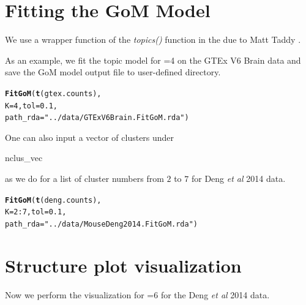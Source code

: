 \documentclass[12pt]{article}\usepackage[]{graphicx}\usepackage[usenames,dvipsnames]{color}
\makeatletter
\newcommand{\hlnum}[1]{\textcolor[rgb]{0.686,0.059,0.569}{#1}}%
\newcommand{\hlstr}[1]{\textcolor[rgb]{0.192,0.494,0.8}{#1}}%
\newcommand{\hlopt}[1]{\textcolor[rgb]{0,0,0}{#1}}%
\newcommand{\hlstd}[1]{\textcolor[rgb]{0.345,0.345,0.345}{#1}}%
\newcommand{\hlkwc}[1]{\textcolor[rgb]{0.333,0.667,0.333}{#1}}%
\newcommand{\hlkwd}[1]{\textcolor[rgb]{0.737,0.353,0.396}{\textbf{#1}}}%
\newenvironment{kframe}{%
 \def\at@end@of@kframe{}%
 \ifinner\ifhmode%
  \def\at@end@of@kframe{\end{minipage}}%
  \begin{minipage}{\columnwidth}%
 \fi\fi%
 \def\FrameCommand##1{\hskip\@totalleftmargin \hskip-\fboxsep
 \colorbox{shadecolor}{##1}\hskip-\fboxsep
     \hskip-\linewidth \hskip-\@totalleftmargin \hskip\columnwidth}%
 \MakeFramed {\advance\hsize-\width
   \@totalleftmargin\z@ \linewidth\hsize
   \@setminipage}}%
 {\par\unskip\endMakeFramed%
 \at@end@of@kframe}
\newenvironment{knitrout}{}{} %
\makeatother
\begin{document}
\section{Fitting the GoM Model}

We use a wrapper function of the \textit{topics()} function in the  due to Matt Taddy \cite{Taddy2012}.

As an example, we fit the topic model for =4 on the GTEx V6 Brain data and save the GoM model output file to user-defined directory.

\begin{knitrout}
\color{fgcolor}\begin{kframe}
\begin{alltt}
\hlkwd{FitGoM}\hlstd{(}\hlkwd{t}\hlstd{(gtex.counts),}
            \hlkwc{K}\hlstd{=}\hlnum{4}\hlstd{,} \hlkwc{tol}\hlstd{=}\hlnum{0.1}\hlstd{,}
            \hlkwc{path_rda}\hlstd{=}\hlstr{"../data/GTExV6Brain.FitGoM.rda"}\hlstd{)}
\end{alltt}
\end{kframe}
\end{knitrout}

One can also input a vector of clusters under \begin{verb} nclus_vec \end{verb} as we do for a list of cluster numbers from $2$ to $7$ for Deng \textit{et al} 2014 data.

\begin{knitrout}
\color{fgcolor}\begin{kframe}
\begin{alltt}
\hlkwd{FitGoM}\hlstd{(}\hlkwd{t}\hlstd{(deng.counts),}
            \hlkwc{K}\hlstd{=}\hlnum{2}\hlopt{:}\hlnum{7}\hlstd{,} \hlkwc{tol}\hlstd{=}\hlnum{0.1}\hlstd{,}
            \hlkwc{path_rda}\hlstd{=}\hlstr{"../data/MouseDeng2014.FitGoM.rda"}\hlstd{)}
\end{alltt}
\end{kframe}
\end{knitrout}



\section{Structure plot visualization}

Now we perform the visualization for =$6$ for the Deng \textit{et al} 2014 data.
\end{document}
